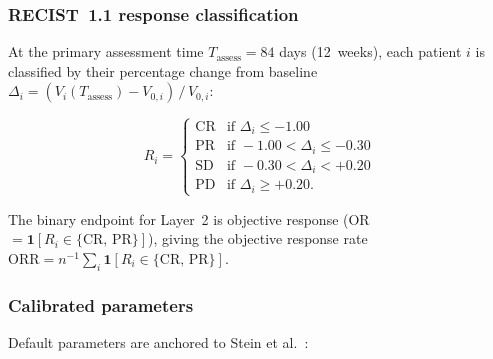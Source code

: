 \documentclass[11pt,a4paper]{article}
\begin{document}
\subsubsection{RECIST~1.1 response classification}
 
At the primary assessment time $T_{\text{assess}} = 84$ days (12~weeks), each
patient $i$ is classified by their percentage change from baseline
$\Delta_i = (V_i(T_{\text{assess}}) - V_{0,i})\,/\,V_{0,i}$:
 
\begin{equation}
  R_i =
  \begin{cases}
    \text{CR} & \text{if } \Delta_i \leq -1.00 \\
    \text{PR} & \text{if } -1.00 < \Delta_i \leq -0.30 \\
    \text{SD} & \text{if } -0.30 < \Delta_i < +0.20 \\
    \text{PD} & \text{if } \Delta_i \geq +0.20.
  \end{cases}
\end{equation}
 
The binary endpoint for Layer~2 is objective response (OR $= \mathbf{1}[R_i \in
\{\text{CR, PR}\}]$), giving the objective response rate
$\text{ORR} = n^{-1}\sum_i \mathbf{1}[R_i \in \{\text{CR, PR}\}]$.
 
\subsubsection{Calibrated parameters}
 
Default parameters are anchored to Stein et al.~\cite{Stein2011}:
 
\end{document}
